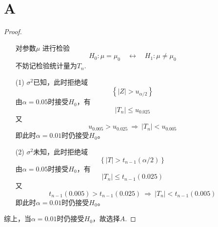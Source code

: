 \documentclass{article}
\begin{document}
\section{A}  %
\begin{proof}
    \begin{enumerate}
        \item []
        \item []对参数$\mu$ 进行检验
        \[
            H_0 : \mu = \mu_0
            \quad \leftrightarrow \quad
            H_1 : \mu \neq \mu_0   
        \]
        不妨记检验统计量为$T_n$.
        \item [(1)]$\sigma^2$已知，此时拒绝域
        \[
            \left\{
                |Z| > u_{\alpha / 2}
            \right\}    
        \]
        由$\alpha = 0.05$时接受$H_0$，有
        \[
            |T_n| \leq u_{0.025}    
        \]
        又
        \[
            u_{0.005} > u_{0.025}
            \ \Rightarrow\ 
            |T_n| < u_{0.005}   
        \]
        即此时$\alpha = 0.01$时仍接受$H_0$。

        \item [(2)]$\sigma^2$未知，此时拒绝域
        \[
            \left\{
                |T| > t_{n-1} (\alpha / 2)
            \right\}    
        \]
        由$\alpha = 0.05$时接受$H_0$，有
        \[
            |T_n| \leq t_{n-1}(0.025)   
        \]
        又
        \[
            t_{n-1} (0.005) > t_{n-1} (0.025)
            \ \Rightarrow\ 
            |T_n| < t_{n-1} (0.005)  
        \]
        即此时$\alpha = 0.01$时仍接受$H_0$。
    \end{enumerate}
    综上，当$\alpha = 0.01$时仍接受$H_0$，故选择$A$.
\end{proof}
\end{document}
